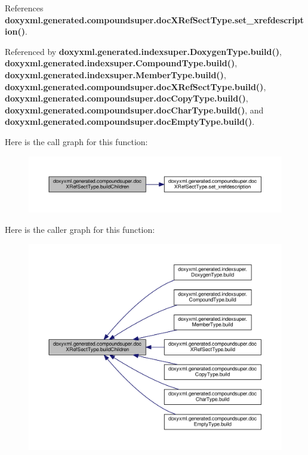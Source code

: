References {\bf doxyxml.\+generated.\+compoundsuper.\+doc\+X\+Ref\+Sect\+Type.\+set\+\_\+xrefdescription()}.



Referenced by {\bf doxyxml.\+generated.\+indexsuper.\+Doxygen\+Type.\+build()}, {\bf doxyxml.\+generated.\+indexsuper.\+Compound\+Type.\+build()}, {\bf doxyxml.\+generated.\+indexsuper.\+Member\+Type.\+build()}, {\bf doxyxml.\+generated.\+compoundsuper.\+doc\+X\+Ref\+Sect\+Type.\+build()}, {\bf doxyxml.\+generated.\+compoundsuper.\+doc\+Copy\+Type.\+build()}, {\bf doxyxml.\+generated.\+compoundsuper.\+doc\+Char\+Type.\+build()}, and {\bf doxyxml.\+generated.\+compoundsuper.\+doc\+Empty\+Type.\+build()}.



Here is the call graph for this function\+:
\nopagebreak
\begin{figure}[H]
\begin{center}
\leavevmode
\includegraphics[width=350pt]{d3/d61/classdoxyxml_1_1generated_1_1compoundsuper_1_1docXRefSectType_a6166d2ee1279f0cbf61f7084d55671b9_cgraph}
\end{center}
\end{figure}




Here is the caller graph for this function\+:
\nopagebreak
\begin{figure}[H]
\begin{center}
\leavevmode
\includegraphics[width=350pt]{d3/d61/classdoxyxml_1_1generated_1_1compoundsuper_1_1docXRefSectType_a6166d2ee1279f0cbf61f7084d55671b9_icgraph}
\end{center}
\end{figure}


